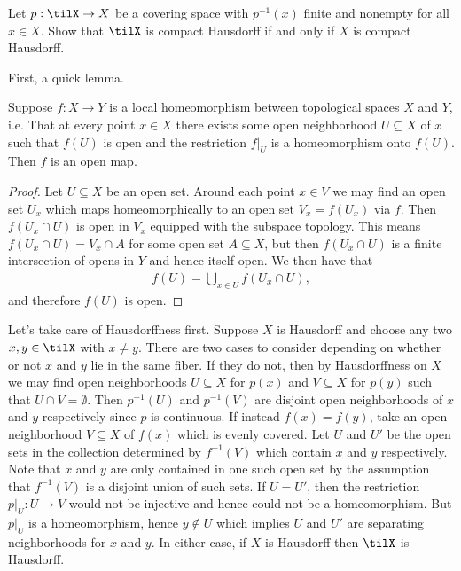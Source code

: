 \begin{homework}[e]
   Let $p:\tilX \to X$ be a covering space with $p^{-1}(x)$ finite and nonempty for all $x \in X$. Show that $\tilX$ is compact Hausdorff if and only if $X$ is compact Hausdorff.
  \begin{prf}
    First, a quick lemma.
    \begin{lem}
      Suppose $f:X\to Y$ is a local homeomorphism between topological spaces $X$ and $Y$, i.e. That at every point $x \in X$ there exists some open neighborhood $U\subseteq X$ of $x$ such that $f(U)$ is open and the restriction $f|_U$ is a homeomorphism onto $f(U)$. Then $f$ is an open map.
    \end{lem}
    \begin{proof}
      Let $U \subseteq X$ be an open set. Around each point $x \in V$ we may find an open set $U_x$ which maps homeomorphically to an open set $V_{x} = f(U_x)$ via $f$. Then $f(U_x\cap U)$ is open in $V_x$ equipped with the subspace topology. This means $f(U_x \cap U) = V_x \cap A$ for some open set $A \subseteq X$, but then $f(U_x\cap U)$ is a finite intersection of opens in $Y$ and hence itself open. We then have that
      \begin{align*}
        f(U) = \bigcup_{x\in U} f(U_x \cap U),
      \end{align*}
      and therefore $f(U)$ is open.
    \end{proof}

    Let's take care of Hausdorffness first. Suppose $X$ is Hausdorff and choose any two $x,y \in \tilX$ with $x \neq y$. There are two cases to consider depending on whether or not $x$ and $y$ lie in the same fiber. If they do not, then by Hausdorffness on $X$ we may find open neighborhoods $U \subseteq X$ for $p(x)$ and $V \subseteq X$ for $p(y)$ such that $U\cap V = \emptyset$. Then $p^{-1}(U)$ and $p^{-1}(V)$ are disjoint open neighborhoods of $x$ and $y$ respectively since $p$ is continuous. If instead $f(x) = f(y)$, take an open neighborhood $V\subseteq X$ of $f(x)$ which is evenly covered. Let $U$ and $U'$ be the open sets in the collection determined by $f^{-1}(V)$ which contain $x$ and $y$ respectively. Note that $x$ and $y$ are only contained in one such open set by the assumption that $f^{-1}(V)$ is a disjoint union of such sets. If $U = U'$, then the restriction $p|_U:U\to V$ would not be injective and hence could not be a homeomorphism. But $p|_U$ is a homeomorphism, hence $y\not\in U$ which implies $U$ and $U'$ are separating neighborhoods for $x$ and $y$. In either case, if $X$ is Hausdorff then $\tilX$ is Hausdorff.


\end{prf}
\end{homework}
